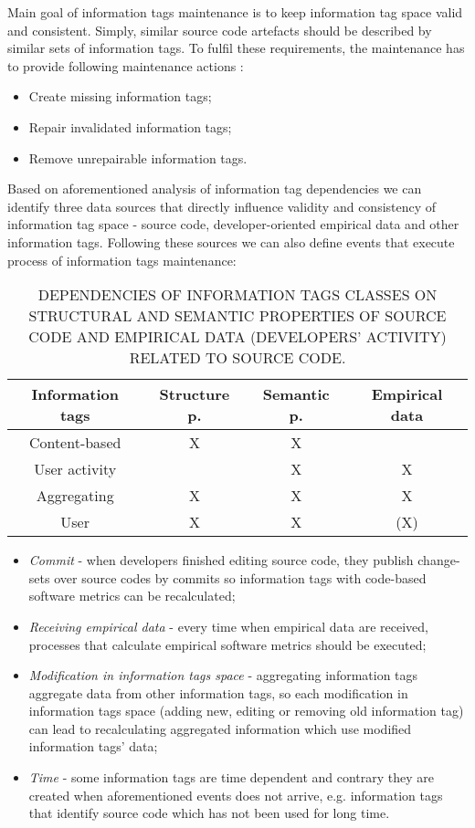 \documentclass[18px,a4, conference]{IEEEtran}
\begin{document}
Main goal of information tags maintenance is to keep information tag space valid and consistent. Simply, similar source code artefacts should be described by similar sets of information tags. To fulﬁl these requirements, the maintenance has to provide following maintenance actions \cite{Bieliková2012}:
\begin{itemize}
\item {Create missing information tags;}
\item { Repair invalidated information tags;}
\item { Remove unrepairable information tags.}
\end{itemize}

Based on aforementioned analysis of information tag dependencies we can identify three data sources that directly inﬂuence validity and consistency of information tag space -  source code, developer-oriented empirical data and other information tags. Following these sources we can also deﬁne events that execute process of information tags maintenance:


\begin{table}																			%
\centering
\caption{DEPENDENCIES OF INFORMATION TAGS CLASSES ON STRUCTURAL AND SEMANTIC PROPERTIES OF SOURCE CODE AND EMPIRICAL DATA (DEVELOPERS’ ACTIVITY) RELATED TO SOURCE CODE.}
\label{tab:Table 1}
\begin{tabular}{|c|c|c|c|}
\hline
Information tags & Structure p. & Semantic p. & Empirical data \\ \hline
Content-based    & X            & X           &                \\ \hline
User activity    &              & X           & X              \\ \hline
Aggregating      & X            & X           & X              \\ \hline
User             & X            & X           & (X)            \\ \hline
\end{tabular}
\end{table}

\begin{itemize}
\item {\textit{Commit} - when developers ﬁnished editing source code, they publish change-sets over source codes by commits so information tags with code-based software metrics can be recalculated;}
\item {\textit{Receiving empirical data} - every time when empirical data are received, processes that calculate empirical software metrics should be executed;}
\item {\textit{Modiﬁcation in information tags space} - aggregating information tags aggregate data from other information tags, so each modiﬁcation in information tags space (adding new, editing or removing old information tag) can lead to recalculating aggregated information which use modiﬁed information tags’ data;}
\item {\textit{Time} - some information tags are time dependent and contrary they are created when aforementioned events does not arrive, e.g. information tags that identify source code which has not been used for long time.}
\end{itemize}
\end{document}
